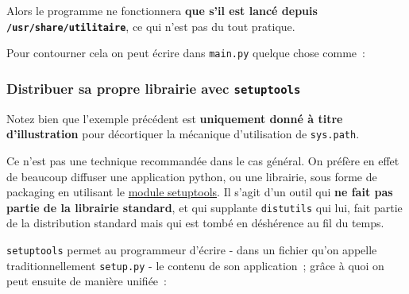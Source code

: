     Alors le programme ne fonctionnera \textbf{que s'il est lancé depuis
\texttt{/usr/share/utilitaire}}, ce qui n'est pas du tout pratique.

    Pour contourner cela on peut écrire dans \texttt{main.py} quelque chose
comme~:

    \begin{Shaded}
\begin{Highlighting}[frame=lines,framerule=0.6mm,rulecolor=\color{asisframecolor}]

\OperatorTok{=}
    
    
\end{Highlighting}
\end{Shaded}

    \hypertarget{distribuer-sa-propre-librairie-avec-setuptools}{%
\subsubsection{\texorpdfstring{Distribuer sa propre librairie avec
\texttt{setuptools}}{Distribuer sa propre librairie avec setuptools}}\label{distribuer-sa-propre-librairie-avec-setuptools}}

    Notez bien que l'exemple précédent est \textbf{uniquement donné à titre
d'illustration} pour décortiquer la mécanique d'utilisation de
\texttt{sys.path}.

Ce n'est pas une technique recommandée dans le cas général. On préfère
en effet de beaucoup diffuser une application python, ou une librairie,
sous forme de packaging en utilisant le
\href{https://pypi.python.org/pypi/setuptools}{module setuptools}. Il
s'agit d'un outil qui \textbf{ne fait pas partie de la librairie
standard}, et qui supplante \texttt{distutils} qui lui, fait partie de
la distribution standard mais qui est tombé en déshérence au fil du
temps.

    \texttt{setuptools} permet au programmeur d'écrire - dans un fichier
qu'on appelle traditionnellement \texttt{setup.py} - le contenu de son
application~; grâce à quoi on peut ensuite de manière unifiée~:

